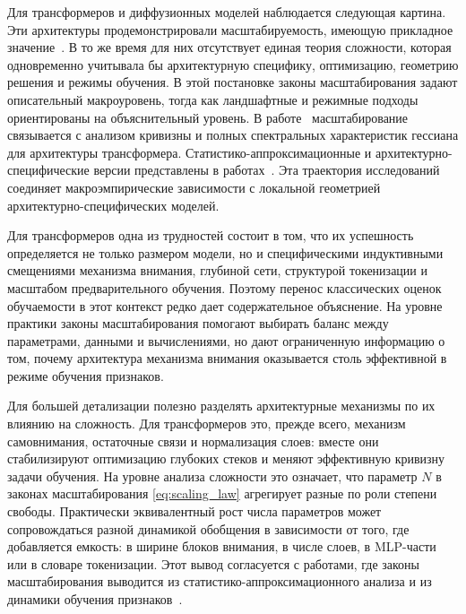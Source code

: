 \documentclass[russian]{intsys}
\begin{document}
Для трансформеров и диффузионных моделей наблюдается следующая картина.
Эти архитектуры продемонстрировали масштабируемость, имеющую прикладное значение~\cite{vaswani2017attention,ho2020denoising}.
В то же время для них отсутствует единая теория сложности, которая одновременно учитывала бы архитектурную специфику, оптимизацию, геометрию решения и режимы обучения.
В этой постановке законы масштабирования задают описательный макроуровень, тогда как ландшафтные и режимные подходы ориентированы на объяснительный уровень.
В работе~\cite{petrov2025curvaturegap} масштабирование связывается с анализом кривизны и полных спектральных характеристик гессиана для архитектуры трансформера. Статистико-аппроксимационные и архитектурно-специфические версии представлены в работах~\cite{transformerScalingLowDim2024,transformerScalingStatApprox2022,moeScalingLaws2026}.
Эта траектория исследований соединяет макроэмпирические зависимости с локальной геометрией архитектурно-специфических моделей.

Для трансформеров одна из трудностей состоит в том, что их успешность определяется не только размером модели, но и специфическими индуктивными смещениями механизма внимания, глубиной сети, структурой токенизации и масштабом предварительного обучения.
Поэтому перенос классических оценок обучаемости в этот контекст редко дает содержательное объяснение.
На уровне практики законы масштабирования помогают выбирать баланс между параметрами, данными и вычислениями, но дают ограниченную информацию о том, почему архитектура механизма внимания оказывается столь эффективной в режиме обучения признаков.

Для большей детализации полезно разделять архитектурные механизмы по их влиянию на сложность. Для трансформеров это, прежде всего, механизм самовнимания, остаточные связи и нормализация слоев: вместе они стабилизируют оптимизацию глубоких стеков и меняют эффективную кривизну задачи обучения. На уровне анализа сложности это означает, что параметр $N$ в законах масштабирования \eqref{eq:scaling_law} агрегирует разные по роли степени свободы. Практически эквивалентный рост числа параметров может сопровождаться разной динамикой обобщения в зависимости от того, где добавляется емкость: в ширине блоков внимания, в числе слоев, в MLP-части или в словаре токенизации.
Этот вывод согласуется с работами, где законы масштабирования выводится из статистико-аппроксимационного анализа и из динамики обучения признаков~\cite{transformerScalingLowDim2024,transformerScalingStatApprox2022,featureDynamicsScaling2025}.
\end{document}
